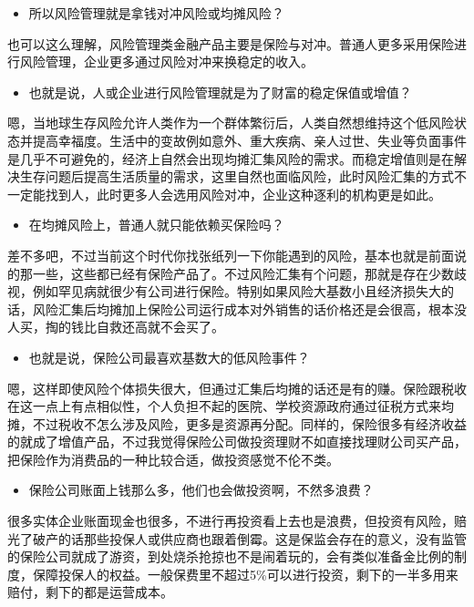 \documentclass[
  letterpaper,
  DIV=11,
  numbers=noendperiod]{scrreprt}
\providecommand{\tightlist}{%
  \setlength{\itemsep}{0pt}\setlength{\parskip}{0pt}}\usepackage{longtable,booktabs,array}
\begin{document}
\begin{itemize}
\tightlist
\item
  所以风险管理就是拿钱对冲风险或均摊风险？
\end{itemize}

也可以这么理解，风险管理类金融产品主要是保险与对冲。普通人更多采用保险进行风险管理，企业更多通过风险对冲来换稳定的收入。

\begin{itemize}
\tightlist
\item
  也就是说，人或企业进行风险管理就是为了财富的稳定保值或增值？
\end{itemize}

嗯，当地球生存风险允许人类作为一个群体繁衍后，人类自然想维持这个低风险状态并提高幸福度。生活中的变故例如意外、重大疾病、亲人过世、失业等负面事件是几乎不可避免的，经济上自然会出现均摊汇集风险的需求。而稳定增值则是在解决生存问题后提高生活质量的需求，这里自然也面临风险，此时风险汇集的方式不一定能找到人，此时更多人会选用风险对冲，企业这种逐利的机构更是如此。

\begin{itemize}
\tightlist
\item
  在均摊风险上，普通人就只能依赖买保险吗？
\end{itemize}

差不多吧，不过当前这个时代你找张纸列一下你能遇到的风险，基本也就是前面说的那一些，这些都已经有保险产品了。不过风险汇集有个问题，那就是存在少数歧视，例如罕见病就很少有公司进行保险。特别如果风险大基数小且经济损失大的话，风险汇集后均摊加上保险公司运行成本对外销售的话价格还是会很高，根本没人买，掏的钱比自救还高就不会买了。

\begin{itemize}
\tightlist
\item
  也就是说，保险公司最喜欢基数大的低风险事件？
\end{itemize}

嗯，这样即使风险个体损失很大，但通过汇集后均摊的话还是有的赚。保险跟税收在这一点上有点相似性，个人负担不起的医院、学校资源政府通过征税方式来均摊，不过税收不怎么涉及风险，更多是资源再分配。同样的，保险很多有经济收益的就成了增值产品，不过我觉得保险公司做投资理财不如直接找理财公司买产品，把保险作为消费品的一种比较合适，做投资感觉不伦不类。

\begin{itemize}
\tightlist
\item
  保险公司账面上钱那么多，他们也会做投资啊，不然多浪费？
\end{itemize}

很多实体企业账面现金也很多，不进行再投资看上去也是浪费，但投资有风险，赔光了破产的话那些投保人或供应商也跟着倒霉。这是保监会存在的意义，没有监管的保险公司就成了游资，到处烧杀抢掠也不是闹着玩的，会有类似准备金比例的制度，保障投保人的权益。一般保费里不超过5\%可以进行投资，剩下的一半多用来赔付，剩下的都是运营成本。
\end{document}
